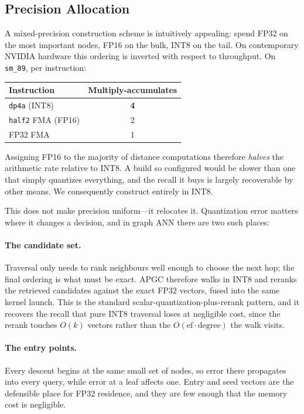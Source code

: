 \documentclass[11pt,twocolumn]{article}
\begin{document}
\subsection{Precision Allocation}
\label{sec:precision}

A mixed-precision construction scheme is intuitively appealing: spend FP32 on
the most important nodes, FP16 on the bulk, INT8 on the tail. On contemporary
NVIDIA hardware this ordering is inverted with respect to throughput. On
\texttt{sm\_89}, per instruction:

\begin{center}
\small
\begin{tabular}{lc}
\toprule
Instruction & Multiply-accumulates \\
\midrule
\texttt{dp4a} (INT8)      & \textbf{4} \\
\texttt{half2} FMA (FP16) & 2 \\
FP32 FMA                  & 1 \\
\bottomrule
\end{tabular}
\end{center}

Assigning FP16 to the majority of distance computations therefore \emph{halves}
the arithmetic rate relative to INT8. A build so configured would be slower than
one that simply quantizes everything, and the recall it buys is largely
recoverable by other means. We consequently construct entirely in INT8.

This does not make precision uniform---it relocates it. Quantization error
matters where it changes a decision, and in graph ANN there are two such places:

\paragraph{The candidate set.} Traversal only needs to rank neighbours well
enough to choose the next hop; the final ordering is what must be exact. APGC
therefore walks in INT8 and reranks the retrieved candidates against the exact
FP32 vectors, fused into the same kernel launch. This is the standard
scalar-quantization-plus-rerank pattern, and it recovers the recall that pure
INT8 traversal loses at negligible cost, since the rerank touches $O(k)$ vectors
rather than the $O(\text{ef}\cdot\text{degree})$ the walk visits.

\paragraph{The entry points.} Every descent begins at the same small set of
nodes, so error there propagates into every query, while error at a leaf affects
one. Entry and seed vectors are the defensible place for FP32 residence, and
they are few enough that the memory cost is negligible.
\end{document}
